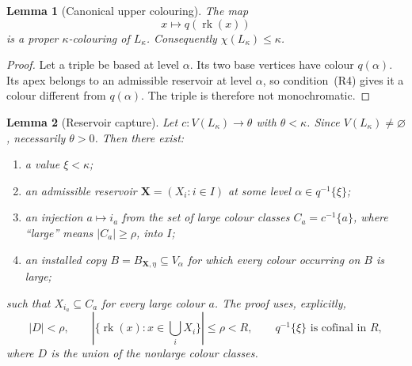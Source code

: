 \documentclass[11pt]{amsart}
\newtheorem{lemma}[lemma]{Lemma}
\theoremstyle{definition}
\theoremstyle{remark}
\numberwithin{equation}{section}
\DeclareMathOperator{\rk}{rk}
\begin{document}
\begin{lemma}[Canonical upper colouring]
\label{lem:calibration-upper}
The map
\[
 x\longmapsto q(\rk(x))
\]
is a proper $\kappa$-colouring of $L_\kappa$.  Consequently
$\chi(L_\kappa)\le\kappa$.
\end{lemma}

\begin{proof}
Let a triple be based at level $\alpha$.  Its two base vertices have
colour $q(\alpha)$.  Its apex belongs to an admissible reservoir at level
$\alpha$, so condition~\textup{(R4)} gives it a colour different from
$q(\alpha)$.  The triple is therefore not monochromatic.
\end{proof}

\begin{lemma}[Reservoir capture]
\label{lem:reservoir-capture}
Let $c:V(L_\kappa)\to\theta$ with $\theta<\kappa$.  Since
$V(L_\kappa)\ne\varnothing$, necessarily $\theta>0$.  Then there exist:
\begin{enumerate}[label=\textup{(\roman*)}]
\item a value $\xi<\kappa$;
\item an admissible reservoir $\mathbf X=(X_i:i\in I)$ at some level
$\alpha\in q^{-1}\{\xi\}$;
\item an injection $a\mapsto i_a$ from the set of large colour classes
$C_a=c^{-1}\{a\}$, where ``large'' means $|C_a|\ge\rho$, into $I$;
\item an installed copy $B=B_{\mathbf X,\eta}\subseteq V_\alpha$
for which every colour occurring on $B$ is large;
\end{enumerate}
such that $X_{i_a}\subseteq C_a$ for every large colour $a$.
The proof uses, explicitly,
\[
 |D|<\rho,
 \qquad
 \left|\{\rk(x):x\in\bigcup_iX_i\}\right|\le\rho<R,
 \qquad
 q^{-1}\{\xi\}\text{ is cofinal in }R,
\]
where $D$ is the union of the nonlarge colour classes.
\end{lemma}
\end{document}
